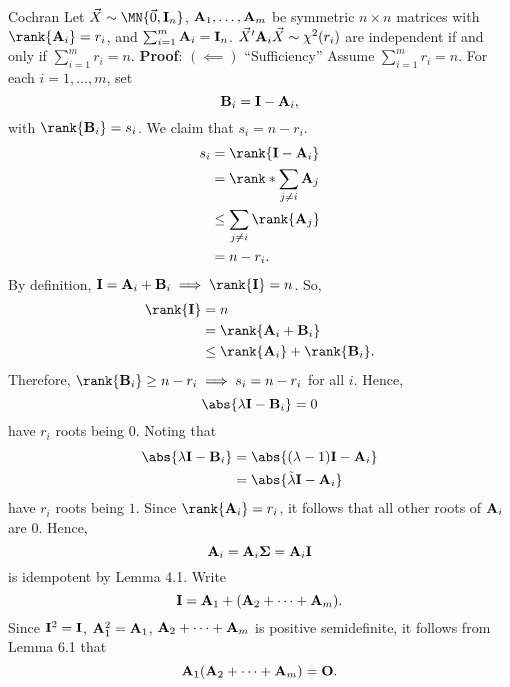 \begin{Theorem}{Cochran}{}
    Let $ \Vector{X}\sim \MN{\Vector{0},\Matrix{I}_n} $,
    $ \mathbf{A}_1,\ldots,\mathbf{A}_m $ be symmetric $ n\times n $
    matrices with $ \rank{\Matrix{A}_i}=r_i $, and
    $ \sum_{i=1}^{m}\mathbf{A}_i=\mathbf{I}_n $.
    $ \vec{X}'\mathbf{A}_i \vec{X}\sim \chi^2(r_i) $
    are independent if and only if
    $ \sum_{i=1}^{m}r_i=n $.
    \tcblower{}
    \textbf{Proof}:
    $ (\impliedby) $ ``Sufficiency'' Assume
    $ \sum_{i=1}^{m}r_i=n $. For each $ i=1,\ldots,m $,
    set
    \[ \mathbf{B}_i=\mathbf{I}-\mathbf{A}_i, \]
    with $ \rank{\Matrix{B}_i}=s_i $. We claim that $ s_i=n-r_i $.
    \begin{align*}
        s_i
         & =\rank{\Matrix{I}-\Matrix{A}_i}      \\
         & =\rank*{\sum_{j\ne i}\Matrix{A}_j}   \\
         & \le \sum_{j\ne i}\rank{\Matrix{A}_j} \\
         & =n-r_i.
    \end{align*}
    By definition, $ \Matrix{I}=\Matrix{A}_i+\Matrix{B}_i\implies \rank{\Matrix{I}}=n $. So,
    \begin{align*}
        \rank{\Matrix{I}}
         & =n                                           \\
         & =\rank{\Matrix{A}_i+\Matrix{B}_i}            \\
         & \le \rank{\Matrix{A}_i}+\rank{\Matrix{B}_i}.
    \end{align*}
    Therefore, $ \rank{\Matrix{B}_i}\ge n-r_i\implies s_i=n-r_i $ for all $ i $.
    Hence,
    \[ \abs{\lambda \Matrix{I}-\Matrix{B}_i}=0 \]
    have $ r_i $ roots being $ 0 $. Noting that
    \begin{align*}
        \abs{\lambda \Matrix{I}-\Matrix{B}_i}
         & =\abs{(\lambda-1)\Matrix{I}-\Matrix{A}_i}     \\
         & =\abs{\tilde{\lambda}\Matrix{I}-\Matrix{A}_i}
    \end{align*}
    have $ r_i $ roots being $ 1 $. Since $ \rank{\Matrix{A}_i}=r_i $,
    it follows that all other roots of $ \mathbf{A}_i $ are $ 0 $.
    Hence,
    \[ \mathbf{A}_i=\mathbf{A}_i \mathbf{\Sigma}=\mathbf{A}_i \mathbf{I} \]
    is idempotent by Lemma 4.1. Write
    \[ \mathbf{I}=\mathbf{A}_1+(\mathbf{A}_2+\cdots+\mathbf{A}_m). \]
    Since $ \mathbf{I}^2=\mathbf{I} $, $ \mathbf{A}_1^2=\mathbf{A}_1 $,
    $ \mathbf{A}_2+\cdots+\mathbf{A}_m $ is positive semidefinite,
    it follows from Lemma 6.1 that
    \[ \mathbf{A}_1(\mathbf{A}_2+\cdots+\mathbf{A}_m)=\mathbf{O}. \]

\end{Theorem}
